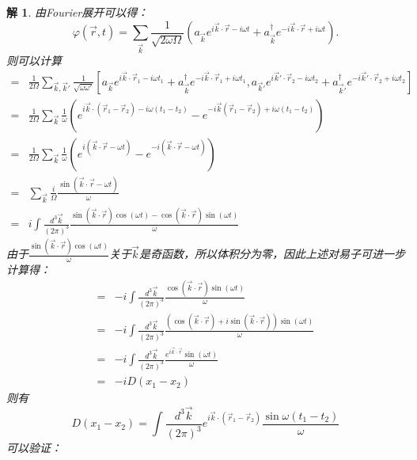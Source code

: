 \documentclass[UTF8,10pt,a4paper]{article}
\theoremstyle{Problem}%
\theoremstyle{Solution}%
\newtheorem*{sol}{解}%
\begin{document}
\begin{sol}
    由Fourier展开可以得：
    \[
        \varphi(\vec{r}, t) = \sum_{\vec{k}} \frac{1}{\sqrt{2\omega\Omega}} \left( a_{\vec{k}} e^{i\vec{k}\cdot\vec{r} - i\omega t} + a_{\vec{k}}^\dagger e^{-i\vec{k} \cdot \vec{r} + i\omega t} \right).
    \]
    则可以计算
    \begin{align*}
        [\varphi(\vec{r}_1, t_1), \varphi(\vec{r}_2, t_2)] =& \frac{1}{2\Omega} \sum_{\vec{k},\vec{k}'} \frac{1}{\sqrt{\omega\omega'}} [a_{\vec{k}}e^{i\vec{k}\cdot\vec{r}_1 - i\omega t_1} + a_{\vec{k}}^\dagger e^{-i\vec{k}\cdot\vec{r}_1 + i\omega t_1}, a_{\vec{k}'}e^{i\vec{k}'\cdot\vec{r}_2 - i\omega t_2} + a_{\vec{k}{'}}^\dagger e^{-i\vec{k}'\cdot\vec{r}_2 + i\omega t_2}] \\
        =& \frac{1}{2\Omega} \sum_{\vec{k}} \frac{1}{\omega} \left( e^{i\vec{k} \cdot (\vec{r}_1 - \vec{r}_2) - i\omega(t_1-t_2)} -  e^{-i\vec{k}(\vec{r}_1 - \vec{r}_2) + i\omega (t_1-t_2)} \right) \\
        =& \frac{1}{2\Omega} \sum_{\vec{k}} \frac{1}{\omega} \left( e^{i(\vec{k}\cdot\vec{r} - \omega t)} - e^{-i(\vec{k}\cdot\vec{r} - \omega t)} \right) \\
        =& \sum_{\vec{k}} \frac{i}{\Omega} \frac{\sin(\vec{k} \cdot \vec{r} - \omega t)}{\omega} \\
        =& i \int \frac{d^3\vec{k}}{(2\pi)^3} \frac{\sin(\vec{k} \cdot \vec{r}) \cos(\omega t) - \cos(\vec{k} \cdot \vec{r}) \sin(\omega t)}{\omega}
    \end{align*}
    由于$\frac{\sin(\vec{k} \cdot \vec{r}) \cos(\omega t)}{\omega}$关于$\vec{k}$是奇函数，所以体积分为零，因此上述对易子可进一步计算得：
    \begin{align*}
        [\varphi(\vec{r}_1, t_1), \varphi(\vec{r}_2, t_2)] =& -i\int \frac{d^3\vec{k}}{(2\pi)^3} \frac{\cos(\vec{k} \cdot \vec{r})\sin(\omega t)}{\omega} \\
        =& -i\int \frac{d^3\vec{k}}{(2\pi)^3} \frac{(\cos(\vec{k}\cdot\vec{r}) + i\sin(\vec{k}\cdot\vec{r})) \sin(\omega t)}{\omega} \\
        =& -i \int \frac{d^3\vec{k}}{(2\pi)^3} \frac{e^{i\vec{k} \cdot \vec{r}} \sin(\omega t)}{\omega} \\
        =& -iD(x_1 - x_2)
    \end{align*}
    则有
    \[
        D(x_1 - x_2) = \int \frac{d^3\vec{k}}{(2\pi)^3}e^{i\vec{k}\cdot(\vec{r}_1 - \vec{r}_2)} \frac{\sin\omega(t_1-t_2)}{\omega}
    \]
    可以验证：
    \begin{align*}

\end{align*}
\end{sol}
\end{document}
